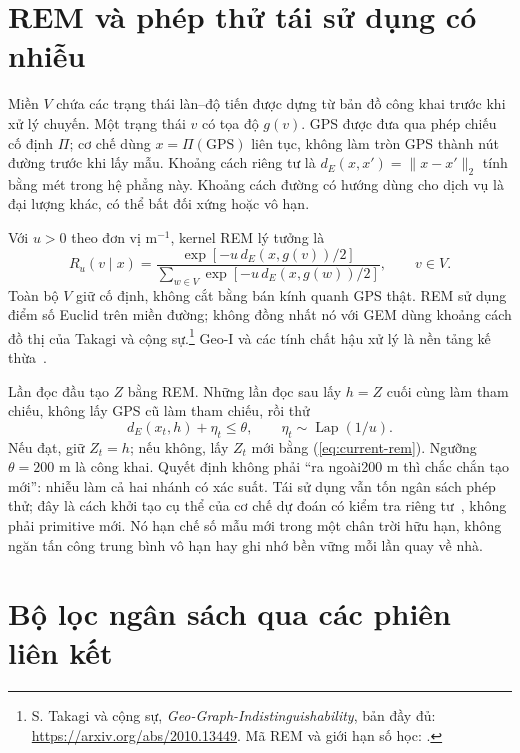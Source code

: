 \section{REM và phép thử tái sử dụng có nhiễu}
\label{sec:current-rem}

Miền $V$ chứa các trạng thái làn--độ tiến được dựng từ bản đồ công khai trước khi xử lý chuyến. Một trạng thái $v$ có tọa độ $g(v)$. GPS được đưa qua phép chiếu cố định $\Pi$; cơ chế dùng $x=\Pi(\mathrm{GPS})$ liên tục, không làm tròn GPS thành nút đường trước khi lấy mẫu. Khoảng cách riêng tư là $d_E(x,x')=\|x-x'\|_2$ tính bằng mét trong hệ phẳng này. Khoảng cách đường có hướng dùng cho dịch vụ là đại lượng khác, có thể bất đối xứng hoặc vô hạn.

Với $u>0$ theo đơn vị $\mathrm m^{-1}$, kernel REM lý tưởng là
\begin{equation}
 R_u(v\mid x)=\frac{\exp[-u\,d_E(x,g(v))/2]}
 {\sum_{w\in V}\exp[-u\,d_E(x,g(w))/2]},\qquad v\in V.
 \label{eq:current-rem}
\end{equation}
Toàn bộ $V$ giữ cố định, không cắt bằng bán kính quanh GPS thật. REM sử dụng điểm số Euclid trên miền đường; không đồng nhất nó với GEM dùng khoảng cách đồ thị của Takagi và cộng sự.\footnote{S. Takagi và cộng sự, \emph{Geo-Graph-Indistinguishability}, bản đầy đủ: \url{https://arxiv.org/abs/2010.13449}. Mã REM và giới hạn số học: .} Geo-I và các tính chất hậu xử lý là nền tảng kế thừa~\cite{andres2013geoi}.

Lần đọc đầu tạo $Z$ bằng REM. Những lần đọc sau lấy $h=Z$ cuối cùng làm tham chiếu, không lấy GPS cũ làm tham chiếu, rồi thử
\begin{equation}
 d_E(x_t,h)+\eta_t\leq\theta,
 \qquad \eta_t\sim\operatorname{Lap}(1/u).
 \label{eq:current-reuse}
\end{equation}
Nếu đạt, giữ $Z_t=h$; nếu không, lấy $Z_t$ mới bằng (\ref{eq:current-rem}). Ngưỡng $\theta=200$ m là công khai. Quyết định không phải ``ra ngoài200 m thì chắc chắn tạo mới'': nhiễu làm cả hai nhánh có xác suất. Tái sử dụng vẫn tốn ngân sách phép thử; đây là cách khởi tạo cụ thể của cơ chế dự đoán có kiểm tra riêng tư~\cite{chatzikokolakis2014predictive}, không phải primitive mới. Nó hạn chế số mẫu mới trong một chân trời hữu hạn, không ngăn tấn công trung bình vô hạn hay ghi nhớ bền vững mỗi lần quay về nhà.

\section{Bộ lọc ngân sách qua các phiên liên kết}
\label{sec:current-budget}

